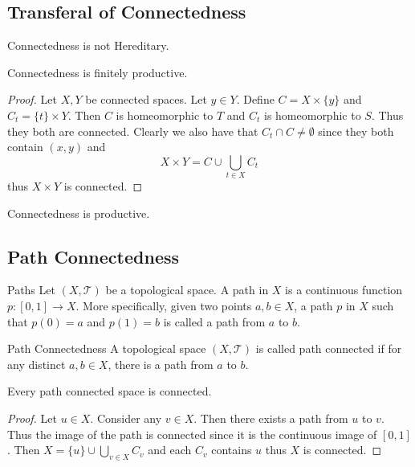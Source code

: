 \documentclass[a4paper]{article}
\begin{document}
\subsection{Transferal of Connectedness}
\begin{prp}{}{} Connectedness is not Hereditary. 
\end{prp}

\begin{prp}{}{} Connectedness is finitely productive. \tcbline
\begin{proof}
Let $X,Y$ be connected spaces. Let $y\in Y$. Define $C=X\times\{y\}$ and $C_t=\{t\}\times Y$. Then $C$ is homeomorphic to $T$ and $C_t$ is homeomorphic to $S$. Thus they both are connected. Clearly we also have that $C_t\cap C\neq\emptyset$ since they both contain $(x,y)$ and $$X\times Y=C\cup\bigcup_{t\in X}C_t$$ thus $X\times Y$ is connected. 
\end{proof}
\end{prp}

\begin{prp}{}{} Connectedness is productive. 
\end{prp}

\subsection{Path Connectedness}
\begin{defn}{Paths}{} Let $(X,\mathcal{T})$ be a topological space. A path in $X$ is a continuous function $p:[0,1]\to X$. More specifically, given two points $a,b\in X$, a path $p$ in $X$ such that $p(0)=a$ and $p(1)=b$ is called a path from $a$ to $b$. 
\end{defn}

\begin{defn}{Path Connectedness}{} A topological space $(X,\mathcal{T})$ is called path connected if for any distinct $a,b\in X$, there is a path from $a$ to $b$. 
\end{defn}

\begin{prp}{}{} Every path connected space is connected. \tcbline
\begin{proof}
Let $u\in X$. Consider any $v\in X$. Then there exists a path from $u$ to $v$. Thus the image of the path is connected since it is the continuous image of $[0,1]$. Then $X=\{u\}\cup\bigcup_{v\in X}C_v$ and each $C_v$ contains $u$ thus $X$ is connected. 
\end{proof}
\end{prp}
\end{document}
